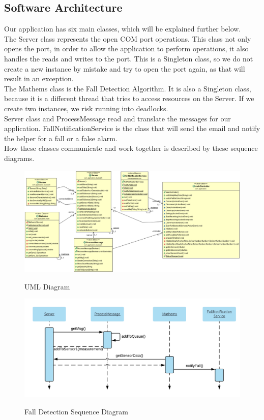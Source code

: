 \documentclass[hidelinks,conference,12pt]{IEEETran}
\begin{document}
\subsection{Software Architecture}
Our application has six main classes, which will be explained further below.\\
The Server class represents the open COM port operations. This class not only opens the port, in order to allow the application to perform operations, it also handles the reads and writes to the port. This is a Singleton class, so we do not create a new instance by mistake and try to open the port again, as that will result in an exception.\\
The Mathems class is the Fall Detection Algorithm. It is also a Singleton class, because it is a different thread that tries to access resources on the Server. If we create two instances, we risk running into deadlocks.\\
Server class and ProcessMessage read and translate the messages for our application. FallNotificationService is the class that will send the email and notify the helper for a fall or a false alarm.\\
How these classes communicate and work together is described by these sequence diagrams.

\clearpage
\FloatBarrier
\begin{figure}[!h]
	\centering
	\caption{UML Diagram}
	\includegraphics[scale=0.4]{images/UML_Diag.png}
	\label{img:UML_Diag}
\end{figure}
\FloatBarrier

\FloatBarrier
\begin{figure}[!h]
	\centering
	\caption{Fall Detection Sequence Diagram}
	\includegraphics[scale=0.55]{images/Seq_Fall.png}
	\label{img:fall}
\end{figure}
\FloatBarrier
\end{document}
